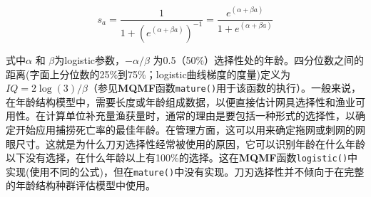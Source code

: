 \documentclass[
  lang=cn,
  11pt,
  scheme=chinese,
  chinesefont=nofont,
  citestyle=gb7714-2015,
  bibstyle=gb7714-2015]{elegantbook}
\begin{document}
\begin{equation}  
{{s}_{a}}=\frac{1}{1+{{({{e}^{(\alpha +\beta a)}})}^{-1}}}=\frac{{{e}^{(\alpha +\beta a)}}}{1+{{e}^{(\alpha +\beta a)}}}  
\label{eq:eq38} 
\end{equation}

式中\(\alpha\) 和 \(\beta\)为logistic参数，\(-\alpha/\beta\) 为0.5（50\%）选择性处的年龄。四分位数之间的距离(字面上分位数的25\%到75\%；logistic曲线梯度的度量)定义为\(IQ=2\log(3)/\beta\)（参见\textbf{MQMF}函数\texttt{mature()}用于该函数的执行）。一般来说，在年龄结构模型中，需要长度或年龄组成数据，以便直接估计网具选择性和渔业可用性。在计算单位补充量渔获量时，通常的理由是要包括一种形式的选择性，以确定开始应用捕捞死亡率的最佳年龄。在管理方面，这可以用来确定拖网或刺网的网眼尺寸。这就是为什么刀刃选择性经常被使用的原因，它可以识别年龄在什么年龄以下没有选择，在什么年龄以上有100\%的选择。这在\textbf{MQMF}函数\texttt{logistic()}中实现(使用不同的公式)，但在\texttt{mature()}中没有实现。刀刃选择性并不倾向于在完整的年龄结构种群评估模型中使用。
\end{document}
